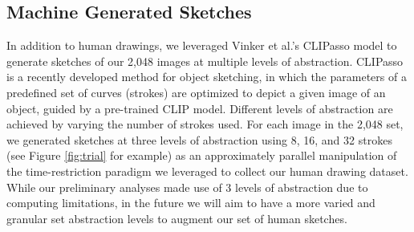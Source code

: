 \documentclass[10pt,letterpaper]{article}
\begin{document}
\subsection{Machine Generated Sketches}
In addition to human drawings, we leveraged Vinker et al.'s \citeyear{vinker2022clipasso} CLIPasso model to generate sketches of our 2,048 images at multiple levels of abstraction.
CLIPasso is a recently developed method for object sketching, in which the parameters of a predefined set of curves (strokes) are optimized to depict a given image of an object, guided by a pre-trained CLIP \cite{radford2021learning} model.
Different levels of abstraction are achieved by varying the number of strokes used. 
For each image in the 2,048 set, we generated sketches at three levels of abstraction using 8, 16, and 32 strokes (see Figure \ref{fig:trial} for example) as an approximately parallel manipulation of the time-restriction paradigm we leveraged to collect our human drawing dataset. 
While our preliminary analyses made use of 3 levels of abstraction due to computing limitations, in the future we will aim to have a more varied and granular set abstraction levels to augment our set of human sketches.



\end{document}
